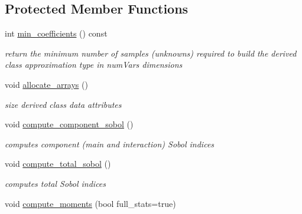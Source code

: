 \subsection*{Protected Member Functions}
\begin{DoxyCompactItemize}
\item 
int \hyperlink{classPecos_1_1InterpPolyApproximation_ac789358ee49633613d6c97593be06f9d}{min\+\_\+coefficients} () const \label{classPecos_1_1InterpPolyApproximation_ac789358ee49633613d6c97593be06f9d}

\begin{DoxyCompactList}\small\item\em return the minimum number of samples (unknowns) required to build the derived class approximation type in num\+Vars dimensions \end{DoxyCompactList}\item 
void \hyperlink{classPecos_1_1InterpPolyApproximation_a37ef37829b412fefa40d53b395846781}{allocate\+\_\+arrays} ()\label{classPecos_1_1InterpPolyApproximation_a37ef37829b412fefa40d53b395846781}

\begin{DoxyCompactList}\small\item\em size derived class data attributes \end{DoxyCompactList}\item 
void \hyperlink{classPecos_1_1InterpPolyApproximation_abec3f45a112004b53f83b3a03e0d06db}{compute\+\_\+component\+\_\+sobol} ()\label{classPecos_1_1InterpPolyApproximation_abec3f45a112004b53f83b3a03e0d06db}

\begin{DoxyCompactList}\small\item\em computes component (main and interaction) Sobol\textquotesingle{} indices \end{DoxyCompactList}\item 
void \hyperlink{classPecos_1_1InterpPolyApproximation_ada0deadfa2c3202ed4e58d066ee079f2}{compute\+\_\+total\+\_\+sobol} ()\label{classPecos_1_1InterpPolyApproximation_ada0deadfa2c3202ed4e58d066ee079f2}

\begin{DoxyCompactList}\small\item\em computes total Sobol\textquotesingle{} indices \end{DoxyCompactList}\item 
void \hyperlink{classPecos_1_1InterpPolyApproximation_a5926c67431b0fc223fcfa6c11cb9de14}{compute\+\_\+moments} (bool full\+\_\+stats=true)\label{classPecos_1_1InterpPolyApproximation_a5926c67431b0fc223fcfa6c11cb9de14}


\end{DoxyCompactItemize}
